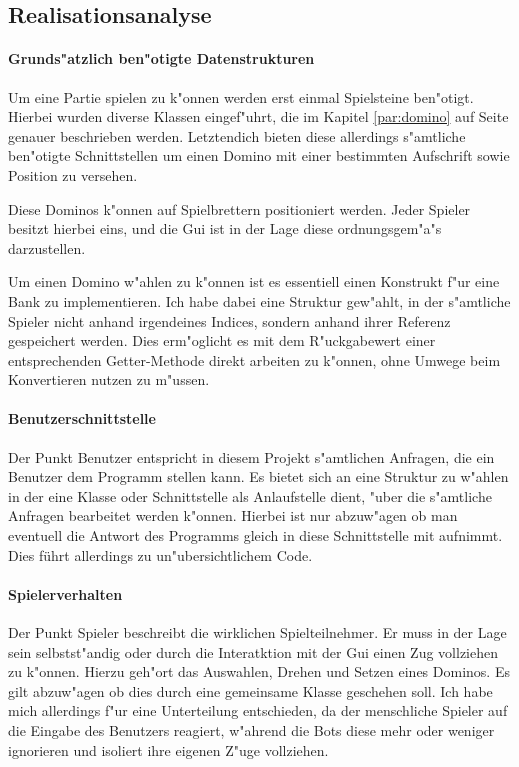 \newpage
\subsection{Realisationsanalyse}
\paragraph{Grunds"atzlich ben"otigte Datenstrukturen}
Um eine Partie spielen zu k"onnen werden erst einmal Spielsteine ben"otigt. Hierbei wurden diverse Klassen eingef"uhrt, die im Kapitel  \ref{par:domino} auf Seite \pageref{par:domino}
genauer beschrieben werden. Letztendich bieten diese allerdings s"amtliche ben"otigte Schnittstellen um einen Domino mit einer bestimmten Aufschrift sowie Position zu versehen. 

Diese Dominos k"onnen auf Spielbrettern positioniert werden. Jeder Spieler besitzt hierbei eins, und die Gui ist in der Lage diese ordnungsgem"a"s darzustellen. 

Um einen Domino w"ahlen zu k"onnen ist es essentiell einen Konstrukt f"ur eine Bank zu implementieren. Ich habe dabei eine Struktur gew"ahlt, in der s"amtliche Spieler nicht anhand irgendeines Indices, sondern anhand ihrer Referenz gespeichert werden. Dies erm"oglicht es mit dem R"uckgabewert einer entsprechenden Getter-Methode direkt arbeiten zu k"onnen, ohne Umwege beim Konvertieren nutzen zu m"ussen. 

\paragraph{Benutzerschnittstelle}
Der Punkt Benutzer entspricht in diesem Projekt s"amtlichen Anfragen, die ein Benutzer dem Programm stellen kann. Es bietet sich an eine Struktur zu w"ahlen in der eine Klasse oder Schnittstelle als Anlaufstelle dient, "uber die s"amtliche Anfragen bearbeitet werden k"onnen. Hierbei ist nur abzuw"agen ob man eventuell die \glqq Antwort\grqq {} des Programms gleich in diese Schnittstelle mit aufnimmt. Dies führt allerdings zu un"ubersichtlichem Code. 

\paragraph{Spielerverhalten}
Der Punkt Spieler beschreibt die wirklichen Spielteilnehmer. Er muss in der Lage sein selbstst"andig oder durch die Interatktion mit der Gui einen Zug vollziehen zu k"onnen. Hierzu geh"ort das Auswahlen, Drehen und Setzen eines Dominos. Es gilt abzuw"agen ob dies durch eine gemeinsame Klasse geschehen soll. Ich habe mich allerdings f"ur eine Unterteilung entschieden, da der menschliche Spieler auf die Eingabe des Benutzers reagiert, w"ahrend die Bots diese mehr oder weniger ignorieren und isoliert ihre eigenen Z"uge vollziehen. 

